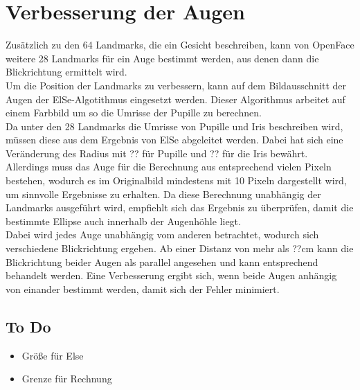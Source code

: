 \section{Verbesserung der Augen}
\label{verbesserung_ElSe}
Zusätzlich zu den 64 Landmarks, die ein Gesicht beschreiben, kann von OpenFace weitere 28 Landmarks für ein Auge bestimmt werden, aus denen dann die Blickrichtung ermittelt wird.\\
Um die Position der Landmarks zu verbessern, kann auf dem Bildausschnitt der Augen der ElSe-Algotithmus eingesetzt werden. Dieser Algorithmus arbeitet auf einem Farbbild um so die Umrisse der Pupille zu berechnen.\\
Da unter den 28 Landmarks die Umrisse von Pupille und Iris beschreiben wird, müssen diese aus dem Ergebnis von ElSe abgeleitet werden. Dabei hat sich eine Veränderung des Radius mit ?? für Pupille und ?? für die Iris bewährt.\\
Allerdings muss das Auge für die Berechnung aus entsprechend vielen Pixeln bestehen, wodurch es im Originalbild mindestens mit 10 Pixeln dargestellt wird, um sinnvolle Ergebnisse zu erhalten. Da diese Berechnung unabhängig der Landmarks ausgeführt wird, empfiehlt sich das Ergebnis zu überprüfen, damit die bestimmte Ellipse auch innerhalb der Augenhöhle liegt.\\
Dabei wird jedes Auge unabhängig vom anderen betrachtet, wodurch sich verschiedene Blickrichtung ergeben. Ab einer Distanz von mehr als ??cm kann die Blickrichtung beider Augen als parallel angesehen und kann entsprechend behandelt werden. Eine Verbesserung ergibt sich, wenn beide Augen anhängig von einander bestimmt werden, damit sich der Fehler minimiert.
\subsection{To Do}
\begin{itemize}
	\item Größe für Else
	\item Grenze für Rechnung
\end{itemize}